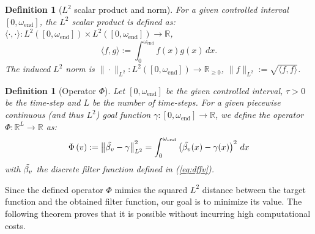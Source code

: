 \documentclass[a4paper,11pt,bibliography=totoc,listof=totoc,headinclude=true,cleardoublepage=empty,oneside]{scrbook}
\newtheorem{definition}[theorem]{Definition}
\newcommand{\R}{\mathbb{R}}
\newcommand{\e}{\mathrm{end}}
\renewcommand{\eqref}[1]{(\ref{#1})}
\begin{document}
\begin{definition}[$L^2$ scalar product and norm]
    For a given controlled interval $[0, \omega_\e]$, the $L^2$ scalar product is defined as: $\langle \cdot, \cdot \rangle : L^2\left([0, \omega_\e]\right) \times L^2\left([0, \omega_\e]\right) \rightarrow \R$, 
    \begin{equation*}
        \langle f, g\rangle := \int_0^{\omega_\e} f(x)g(x) \, dx.
    \end{equation*}
    The induced $L^2$ norm is $\| \cdot \|_{L^2}: L^2\left([0, \omega_\e]\right)  \rightarrow \R_{\geqslant 0}$, $\|f\|_{L^2} := \sqrt{\langle f, f \rangle}$.

\end{definition}
\begin{definition}[Operator $\Phi$]\label{def:Phi}
    Let $[0, \omega_\e]$ be the given controlled interval, $\tau > 0$ be the time-step and $L$ be the number of time-steps. For a given piecewise continuous (and thus $L^2$) goal function $\gamma : [0, \omega_\e] \rightarrow \R$, we define the operator $\Phi :\R^L \rightarrow \R $ as:
    \begin{align*}
        \Phi\left(v\right) := \left\| \Tilde{\beta_v} - \gamma \right\|_{L^2}^2 = \int_0^{\omega_\e} \left(\Tilde{\beta_v}(x) - \gamma(x) \right)^2 \, dx
    \end{align*}
    with $\Tilde{\beta_v}$ the discrete filter function defined in \eqref{eq:dffv}.
\end{definition} 

Since the defined operator $\Phi$ mimics the squared $L^2$ distance between the target function and the obtained filter function, our goal is to minimize its value. The following theorem proves that it is possible without incurring high computational costs.
\end{document}

